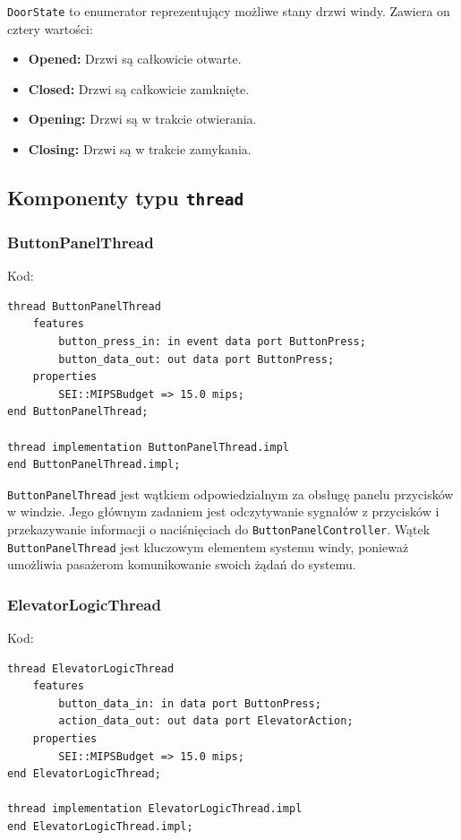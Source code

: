 \documentclass{article}
\begin{document}
    \texttt{DoorState} to enumerator reprezentujący możliwe stany drzwi windy. Zawiera on cztery wartości:

    \begin{itemize}
        \item \textbf{Opened:} Drzwi są całkowicie otwarte.
        \item \textbf{Closed:} Drzwi są całkowicie zamknięte.
        \item \textbf{Opening:} Drzwi są w trakcie otwierania.
        \item \textbf{Closing:} Drzwi są w trakcie zamykania.
    \end{itemize}



    \subsection{Komponenty typu \texttt{thread}}

    
    \subsubsection{ButtonPanelThread}

    Kod:
    
    \begin{lstlisting}[basicstyle=\ttfamily, keywordstyle=\bfseries]
thread ButtonPanelThread
    features
        button_press_in: in event data port ButtonPress;
        button_data_out: out data port ButtonPress;
    properties
        SEI::MIPSBudget => 15.0 mips;
end ButtonPanelThread;

thread implementation ButtonPanelThread.impl
end ButtonPanelThread.impl;
    \end{lstlisting}

    \texttt{ButtonPanelThread} jest wątkiem odpowiedzialnym za obsługę panelu przycisków w windzie. Jego głównym zadaniem jest odczytywanie sygnałów z przycisków i przekazywanie informacji o naciśnięciach do \texttt{ButtonPanelController}. Wątek \texttt{ButtonPanelThread} jest kluczowym elementem systemu windy, ponieważ umożliwia pasażerom komunikowanie swoich żądań do systemu.

    
    \subsubsection{ElevatorLogicThread}

    Kod:
    
    \begin{lstlisting}[basicstyle=\ttfamily, keywordstyle=\bfseries]
thread ElevatorLogicThread
    features
        button_data_in: in data port ButtonPress;
        action_data_out: out data port ElevatorAction;
    properties
        SEI::MIPSBudget => 15.0 mips;
end ElevatorLogicThread;

thread implementation ElevatorLogicThread.impl
end ElevatorLogicThread.impl;
    \end{lstlisting}
\end{document}

